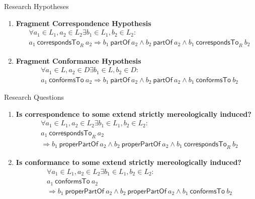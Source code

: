 \documentclass{beamer}
\newcommand{\partOf}{~\textsf{partOf}~}
\newcommand{\properPartOf}{~\textsf{properPartOf}~}
\newcommand{\correspondsToR}[1]{~\textsf{correspondsTo}_{#1}~}
\newcommand{\conformsTo}{~\textsf{conformsTo}~}
\begin{document}
\begin{frame}{Research Hypotheses}
\begin{enumerate}[RH1]
\item
\textbf{Fragment Correspondence Hypothesis}
{\scriptsize
\begin{align*}
&\forall a_1 \in L_1, a_2 \in L_2 \exists b_1 \in L_1, b_2 \in L_2 :  
\\&a_1 \correspondsToR{R} a_2
\Rightarrow 
b_1 \partOf a_2 
\wedge b_2 \partOf a_2
\wedge b_1 \correspondsToR{R} b_2
\end{align*}
}
\item
\textbf{Fragment Conformance Hypothesis}
{\scriptsize
\begin{align*}
&\forall a_1 \in L, a_2 \in D \exists b_1 \in L, b_2 \in D : 
\\&a_1 \conformsTo a_2
\Rightarrow 
b_1 \partOf a_2
\wedge b_2 \partOf a_2
\wedge b_1 \conformsTo b_2
\end{align*}
}
\end{enumerate}
\end{frame}

\begin{frame}{Research Questions}
\begin{enumerate}[RQ1]

\item
\textbf{Is correspondence to some extend strictly mereologically induced?}
{\scriptsize
\begin{align*}
&\forall a_1 \in L_1, a_2 \in L_2 \exists b_1 \in L_1, b_2 \in L_2 :
\\&a_1 \correspondsToR{R} a_2
\\&\Rightarrow 
b_1 \properPartOf a_2 
\wedge b_2 \properPartOf a_2 
\wedge b_1 \correspondsToR{R} b_2
\end{align*}
}

\item
\textbf{Is conformance to some extend strictly mereologically induced?}
{\scriptsize
\begin{align*}
&\forall a_1 \in L_1, a_2 \in L_2 \exists b_1 \in L_1, b_2 \in L_2 :
\\&a_1 \conformsTo a_2
\\&\Rightarrow 
b_1 \properPartOf a_2 
\wedge b_2 \properPartOf a_2 
\wedge b_1 \conformsTo b_2
\end{align*}
}

\end{enumerate}
\end{frame}
\end{document}
